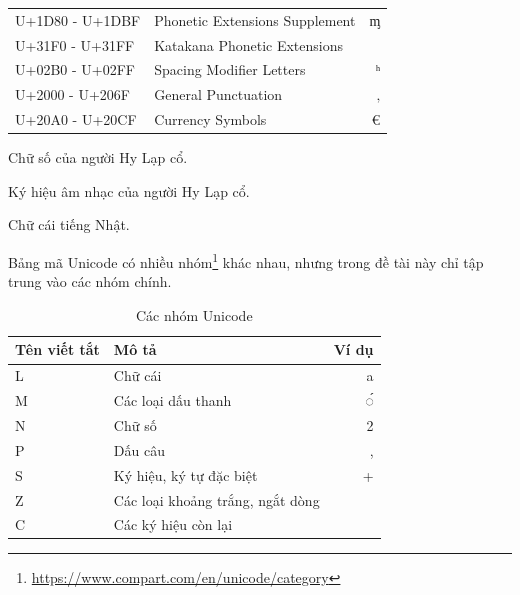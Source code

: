 \begin{table}[htb]
\begin{threeparttable}
\begin{tabular}{llr}
            U+1D80 - U+1DBF   & Phonetic Extensions Supplement          & ᶆ              \\
            U+31F0 - U+31FF   & Katakana Phonetic Extensions\tnote{3}   &                \\
            U+02B0 - U+02FF   & Spacing Modifier Letters                & ʰ              \\
            U+2000 - U+206F   & General Punctuation                     & ‚              \\
            U+20A0 - U+20CF   & Currency Symbols                        & €              \\
            \bottomrule
        \end{tabular}
        \begin{tablenotes}
            \item [1] Chữ số của người Hy Lạp cổ.
            \item [2] Ký hiệu âm nhạc của người Hy Lạp cổ.
            \item [3] Chữ cái tiếng Nhật.
        \end{tablenotes}
    \end{threeparttable}
\end{table}

\newpage
Bảng mã Unicode có nhiều nhóm\footnote{\url{https://www.compart.com/en/unicode/category}} khác nhau, nhưng trong đề tài này chỉ tập trung vào các nhóm chính.
\begin{table}[htb]
    \centering
    \caption{Các nhóm Unicode}
    \label{table:unicode-categories}
    \begin{tabular}{llr}
        \toprule
        \textbf{Tên viết tắt} & \textbf{Mô tả}                   & \textbf{Ví dụ} \\\midrule
        L                     & Chữ cái                          & a              \\
        M                     & Các loại dấu thanh               & ◌́              \\
        N                     & Chữ số                           & 2              \\
        P                     & Dấu câu                          & ,              \\
        S                     & Ký hiệu, ký tự đặc biệt          & +              \\
        Z                     & Các loại khoảng trắng, ngắt dòng &                \\
        C                     & Các ký hiệu còn lại              &                \\
        \bottomrule
    \end{tabular}
\end{table}

